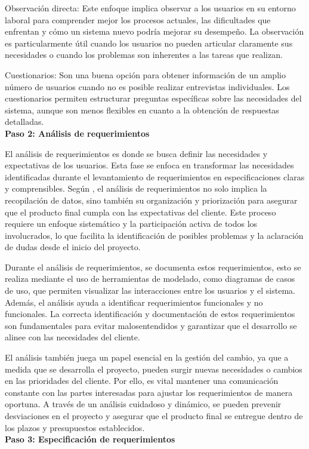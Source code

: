 		Observación directa: Este enfoque implica observar a los usuarios en su entorno laboral para comprender mejor los procesos actuales, las dificultades que enfrentan y cómo un sistema nuevo podría mejorar su desempeño. La observación es particularmente útil cuando los usuarios no pueden articular claramente sus necesidades o cuando los problemas son inherentes a las tareas que realizan.
		
		Cuestionarios: Son una buena opción para obtener información de un amplio número de usuarios cuando no es posible realizar entrevistas individuales. Los cuestionarios permiten estructurar preguntas específicas sobre las necesidades del sistema, aunque son menos flexibles en cuanto a la obtención de respuestas detalladas.\\
		\textbf{Paso 2: Análisis de requerimientos}
		
		El análisis de requerimientos es donde se busca definir las necesidades y expectativas de los usuarios. Esta fase se enfoca en transformar las necesidades identificadas durante el levantamiento de requerimientos en especificaciones claras y comprensibles. Según \textcite{sommerville2011introduccion}, el análisis de requerimientos no solo implica la recopilación de datos, sino también su organización y priorización para asegurar que el producto final cumpla con las expectativas del cliente. Este proceso requiere un enfoque sistemático y la participación activa de todos los involucrados, lo que facilita la identificación de posibles problemas y la aclaración de dudas desde el inicio del proyecto.
		
		Durante el análisis de requerimientos, se documenta estos requerimientos, esto se realiza mediante el uso de herramientas de modelado, como diagramas de casos de uso, que permiten visualizar las interacciones entre los usuarios y el sistema. Además, el análisis ayuda a identificar requerimientos funcionales y no funcionales. La correcta identificación y documentación de estos requerimientos son fundamentales para evitar malosentendidos y garantizar que el desarrollo se alinee con las necesidades del cliente.
		
		El análisis también juega un papel esencial en la gestión del cambio, ya que a medida que se desarrolla el proyecto, pueden surgir nuevas necesidades o cambios en las prioridades del cliente. Por ello, es vital mantener una comunicación constante con las partes interesadas para ajustar los requerimientos de manera oportuna. A través de un análisis cuidadoso y dinámico, se pueden prevenir desviaciones en el proyecto y asegurar que el producto final se entregue dentro de los plazos y presupuestos establecidos.\\
		\textbf{Paso 3: Especificación de requerimientos}
		
